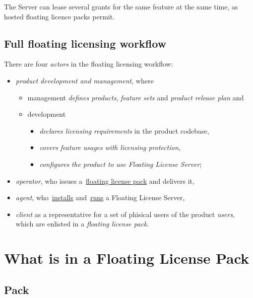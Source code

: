 \documentclass[12pt]{report}
\begin{document}
The Server can lease several grants for the same feature at the same time, as hosted floating licence packs permit.

\section*{Full floating licensing workflow}

There are four \textit{actors} in the floating licensing workflow:

\begin{itemize}
	\item \textit{product development and management}, where
		\begin{itemize}
		    \item management \textit{defines products}, \textit{feature sets} and \textit{product release plan} and
		    \item development
		    	\begin{itemize}
		      		\item \textit{declares licensing requirements} in the product codebase,
		      		\item  \textit{covers feature usages with licensing protection},
		      		\item  \textit{configures the product to use Floating License Server};
		      	\end{itemize}
      	\end{itemize}
	\item \textit{operator}, who issues a~\hyperref[ch:flp]{floating license pack} and delivers it,  
	\item \textit{agent}, who~\hyperref[ch:install-fls]{installs} and~\hyperref[ch:run-fls]{runs} a Floating License Server,
	\item \textit{client} as a representative for a set of phisical users of the product \textit{users}, which are enlisted in a \textit{floating license pack}.

\end{itemize} 

\chapter*{What is in a Floating License Pack} \label{ch:flp}

\section*{Pack} \label{sec:flp-pack}
\end{document}
